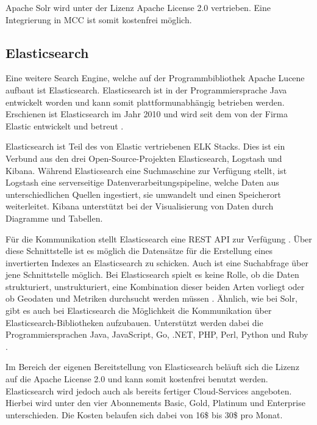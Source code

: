 Apache Solr wird unter der Lizenz \glqq Apache License 2.0\grqq{} vertrieben. Eine Integrierung in MCC ist somit kostenfrei möglich.

\subsection{Elasticsearch\label{subsec4.1.4:Unterunterpunkt-4}}

Eine weitere Search Engine, welche auf der Programmbibliothek \glqq Apache Lucene\grqq{} aufbaut ist Elasticsearch. Elasticsearch ist in der Programmiersprache Java entwickelt worden und kann somit plattformunabhängig betrieben werden. Erschienen ist Elasticsearch im Jahr 2010 und wird seit dem von der Firma Elastic entwickelt und betreut \cite{Elastic.2021}.

Elasticsearch ist Teil des von Elastic vertriebenen \glqq ELK Stacks\grqq{}. Dies ist ein Verbund aus den drei Open-Source-Projekten \glqq Elasticsearch\grqq{}, \glqq Logstash\grqq{} und \glqq Kibana\grqq{}. Während Elasticsearch eine Suchmaschine zur Verfügung stellt, ist Logstash eine serverseitige Datenverarbeitungspipeline, welche Daten aus unterschiedlichen Quellen ingestiert, sie umwandelt und einen Speicherort weiterleitet. Kibana unterstützt bei der Visualisierung von Daten durch Diagramme und Tabellen.

Für die Kommunikation stellt Elasticsearch eine REST API zur Verfügung \cite{Elasticsearch.2021}. Über diese Schnittstelle ist es möglich die Datensätze für die Erstellung eines invertierten Indexes an Elasticsearch zu schicken. Auch ist eine Suchabfrage über jene Schnittstelle möglich. Bei Elasticsearch spielt es keine Rolle, ob die Daten strukturiert, unstrukturiert, eine Kombination dieser beiden Arten vorliegt oder ob Geodaten und Metriken durchsucht werden müssen \cite{Elasticsearch.2021}. Ähnlich, wie bei Solr, gibt es auch bei Elasticsearch die Möglichkeit die Kommunikation über Elasticsearch-Bibliotheken aufzubauen. Unterstützt werden dabei die Programmiersprachen Java, JavaScript, Go, .NET, PHP, Perl, Python und Ruby \cite{Elasticsearch.2021}.

Im Bereich der eigenen Bereitstellung von Elasticsearch beläuft sich die Lizenz auf die \glqq Apache License 2.0\grqq{} und kann somit kostenfrei benutzt werden. Elasticsearch wird jedoch auch als bereits fertiger Cloud-Services angeboten. Hierbei wird unter den vier Abonnements \glqq Basic\grqq{}, \glqq Gold\grqq{}, \glqq Platinum\grqq{} und \glqq Enterprise\grqq{} unterschieden. Die Kosten belaufen sich dabei von 16\$ bis 30\$ pro Monat.

